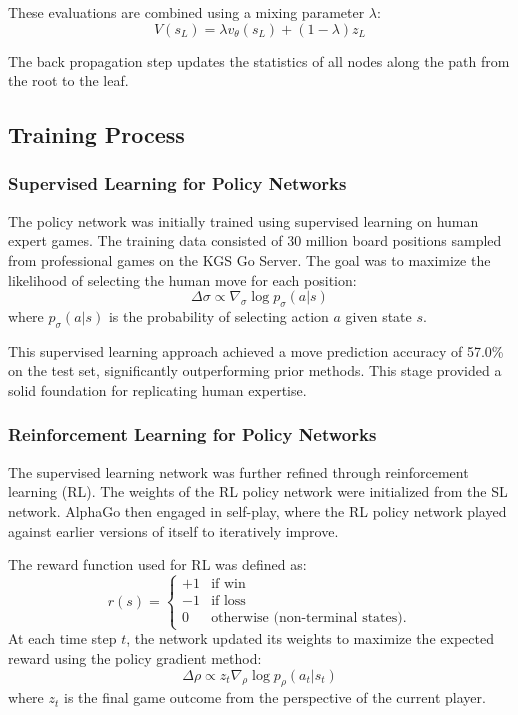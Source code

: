 These evaluations are combined using a mixing parameter \( \lambda \):
\[
V(s_L) = \lambda v_\theta(s_L) + (1 - \lambda) z_L
\]

The back propagation step updates the statistics of all nodes along the path from the root to the leaf.

\subsection{Training Process}

\subsubsection{Supervised Learning for Policy Networks}
The policy network was initially trained using supervised learning on human expert games. The training data consisted of 30 million board positions sampled from professional games on the KGS Go Server. The goal was to maximize the likelihood of selecting the human move for each position:
\[
\Delta \sigma \propto \nabla_\sigma \log p_\sigma(a | s)
\]
where \( p_\sigma(a | s) \) is the probability of selecting action \( a \) given state \( s \).

This supervised learning approach achieved a move prediction accuracy of 57.0\% on the test set, significantly outperforming prior methods. This stage provided a solid foundation for replicating human expertise.

\subsubsection{Reinforcement Learning for Policy Networks}
The supervised learning network was further refined through reinforcement learning (RL). The weights of the RL policy network were initialized from the SL network. AlphaGo then engaged in self-play, where the RL policy network played against earlier versions of itself to iteratively improve.

The reward function used for RL was defined as:
\[
r(s) = 
\begin{cases} 
+1 & \text{if win} \\
-1 & \text{if loss} \\
0 & \text{otherwise (non-terminal states).}
\end{cases}
\]
At each time step \( t \), the network updated its weights to maximize the expected reward using the policy gradient method:
\[
\Delta \rho \propto z_t \nabla_\rho \log p_\rho(a_t | s_t)
\]
where \( z_t \) is the final game outcome from the perspective of the current player.

